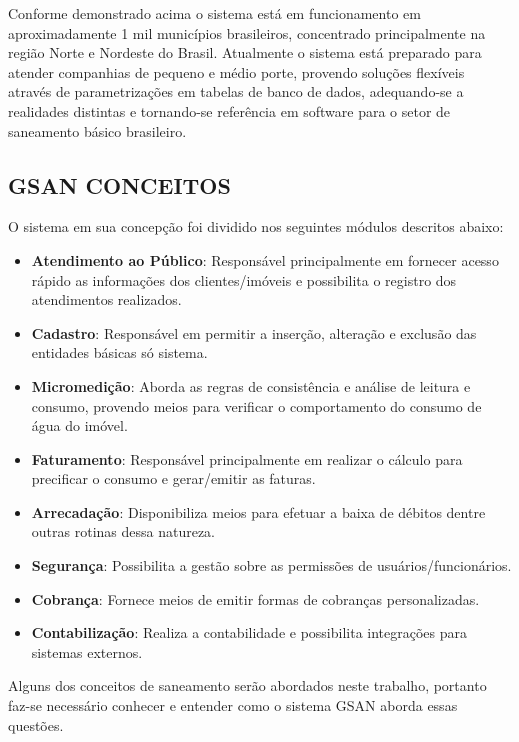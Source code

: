 Conforme demonstrado acima o sistema está em funcionamento em aproximadamente 1 mil municípios brasileiros, concentrado principalmente na região Norte e Nordeste do Brasil.
Atualmente o sistema está preparado para atender companhias de pequeno e médio porte, provendo soluções flexíveis através de parametrizações em tabelas de banco de dados, adequando-se a realidades distintas e tornando-se referência em software para o setor de saneamento básico brasileiro. 

\subsection{\textbf{GSAN CONCEITOS}}

O sistema em sua concepção foi dividido nos seguintes módulos descritos abaixo:
\begin{itemize}
\item \textbf{Atendimento ao Público}: Responsável principalmente em fornecer acesso rápido as informações dos clientes/imóveis e possibilita o registro dos atendimentos realizados.
\item \textbf{Cadastro}: Responsável em permitir a inserção, alteração e exclusão das entidades básicas só sistema.
\item \textbf{Micromedição}: Aborda as regras de consistência e análise de leitura e consumo, provendo meios para verificar o comportamento do consumo de água do imóvel.
\item \textbf{Faturamento}: Responsável principalmente em realizar o cálculo para precificar o consumo e gerar/emitir as faturas.
\item \textbf{Arrecadação}: Disponibiliza meios para efetuar a baixa de débitos dentre outras rotinas dessa natureza.
\item \textbf{Segurança}: Possibilita a gestão sobre as permissões de usuários/funcionários.
\item \textbf{Cobrança}: Fornece meios de emitir formas de cobranças personalizadas.
\item \textbf{Contabilização}: Realiza a contabilidade e possibilita integrações para sistemas externos.
\end{itemize}

Alguns dos conceitos de saneamento serão abordados neste trabalho, portanto faz-se necessário conhecer e entender como o sistema GSAN aborda essas questões.

